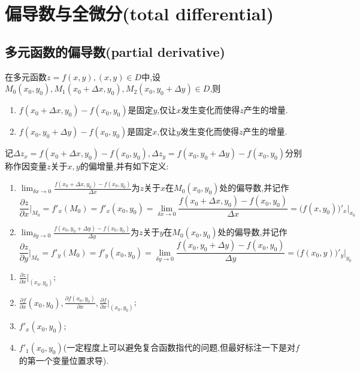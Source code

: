 \setcounter{chapter}{6} %

\chapter{偏导数与全微分(total differential)}

\section{多元函数的偏导数(partial derivative)}

在多元函数$z=f(x,y),(x,y)\in D$中,设$M_0(x_0,y_0),M_1(x_0+\Delta x,y_0),M_2(x_0,y_0+\Delta y)\in D $,则
\begin{enumerate}
    \item $f(x_0+\Delta x,y_0)-f(x_0,y_0)$是固定$y$,仅让$x$发生变化而使得$z$产生的增量.
    \item $f(x_0,y_0+\Delta y)-f(x_0,y_0)$是固定$x$,仅让$y$发生变化而使得$z$产生的增量.
\end{enumerate}

记$\Delta z_x =f(x_0+\Delta x,y_0)-f(x_0,y_0),\Delta z_y =f(x_0,y_0+\Delta y)-f(x_0,y_0)$分别称作因变量$z$关于$x,y$的偏增量,并有如下定义:
\begin{definition}
    \begin{enumerate}
        \item $\lim_{\delta x \to 0}\frac{f(x_0+\Delta x,y_0)-f(x_0,y_0)}{\Delta x}$为$z$关于$x$在$M_0(x_0,y_0)$处的偏导数,并记作
        $$\frac{\partial z}{\partial x}\bigg|_{M_0}=f'_x(M_0)=f'_x(x_0,y_0)=\lim_{\delta x \to 0}\frac{f(x_0+\Delta x,y_0)-f(x_0,y_0)}{\Delta x}=\big(f(x,y_0)\big)'_x\bigg|_{x_0}$$

        \item $\lim_{\delta y \to 0}\frac{f(x_0,y_0+\Delta y)-f(x_0,y_0)}{\Delta y}$为$z$关于$y$在$M_0(x_0,y_0)$处的偏导数,并记作
        $$\frac{\partial z}{\partial y}\bigg|_{M_0}=f'_y(M_0)=f'_y(x_0,y_0)=\lim_{\delta y \to 0}\frac{f(x_0,y_0+\Delta y)-f(x_0,y_0)}{\Delta y}=\big(f(x_0,y)\big)'_y\bigg|_{y_0}$$
    \end{enumerate}
\end{definition}

\begin{remark}
    \begin{enumerate}
        \item $\frac{\partial z}{\partial x}\bigg|_{(x_0,y_0)}$;
        \item $\frac{\partial f}{\partial x}(x_0,y_0),\frac{\partial f(x_0,y_0)}{\partial x},\frac{\partial f}{\partial x}\bigg|_{(x_0,y_0)}$;
        \item $f'_x(x_0,y_0)$;
        \item $f'_1(x_0,y_0)$(一定程度上可以避免复合函数指代的问题,但最好标注一下是对$f$的第一个变量位置求导).
    \end{enumerate}
\end{remark}

